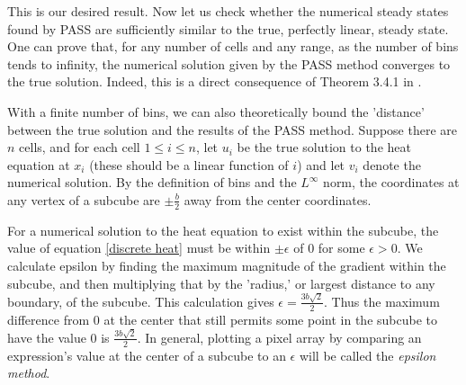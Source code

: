 \documentclass[11pt]{article}
\begin{document}
This is our desired result. Now let us check whether the numerical steady states found by PASS are sufficiently similar to the true, perfectly linear, steady state. One can prove that, for any number of cells and any range, as the number of bins tends to infinity, the numerical solution given by the PASS method converges to the true solution. Indeed, this is a direct consequence of Theorem 3.4.1 in \citep{Introduction_to_PA}.
%
%
%
%

With a finite number of bins, we can also theoretically bound the 'distance' between the true solution and the results of the PASS method. Suppose there are $n$ cells, and for each cell $1\leq i\leq n$, let $u_i$ be the true solution to the heat equation at $x_i$ (these should be a linear function of $i$) and let $v_i$ denote the numerical solution. By the definition of bins and the $L^\infty$ norm, the coordinates at any vertex of a subcube are $\pm \frac{b}{2}$ away from the center coordinates. 

For a numerical solution to the heat equation to exist within the subcube, the value of equation \cref{discrete heat} must be within $\pm \epsilon$ of 0 for some $\epsilon > 0$. We calculate epsilon by finding the maximum magnitude of the gradient within the subcube, and then multiplying that by the 'radius,' or largest distance to any boundary, of the subcube. This calculation gives $\epsilon = \frac{3b\sqrt{2}}{2}$. Thus the maximum difference from 0 at the center that still permits some point in the subcube to have the value 0 is $\frac{3b\sqrt{2}}{2}$. In general, plotting a pixel array by comparing an expression's value at the center of a subcube to an $\epsilon$ will be called the \emph{epsilon method}.
\end{document}

